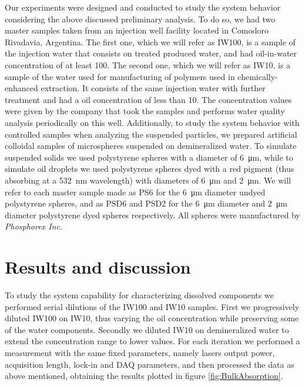 \documentclass[9pt,twocolumn,twoside]{osajnl}
\begin{document}
Our experiments were designed and conducted to study the system behavior considering the above discussed preliminary analysis. To do so, we had two master samples taken from an injection well facility located in Comodoro Rivadavia, Argentina. The first one, which we will refer as IW100, is a sample of the injection water that consists on treated produced water, and had oil-in-water concentration of at least \SI{100}{\ppm}. The second one, which we will refer as IW10, is a sample of the water used for manufacturing of polymers used in chemically-enhanced extraction. It consists of the same injection water with further treatment and had a oil concentration of less than \SI{10}{\ppm}. The concentration values were given by the company that took the samples and performs water quality analysis periodically on this well. Additionally, to study the system behavior with controlled samples when analyzing the suspended particles, we prepared artificial colloidal samples of microspheres suspended on demineralized water. To simulate suspended solids we used polystyrene spheres with a diameter of \SI{6}{\micro\metre}, while to simulate oil droplets we used polystyrene spheres dyed with a red pigment (thus absorbing at a \SI{532}{\nano\metre} wavelength) with diameters of \SI{6}{\micro\metre} and \SI{2}{\micro\metre}. We will refer to each master sample made as PS6 for the \SI{6}{\micro\metre} diameter undyed polystyrene spheres, and as PSD6 and PSD2 for the \SI{6}{\micro\metre} diameter and \SI{2}{\micro\metre} diameter polystyrene dyed spheres respectively. All spheres were manufactured by \emph{Phosphorex Inc.}








\section{Results and discussion}
\label{Results}

To study the system capability for characterizing dissolved components we performed serial dilutions of the IW100 and IW10 samples. First we progressively diluted IW100 on IW10, thus varying the oil concentration while preserving some of the water components. Secondly we diluted IW10 on demineralized water to extend the concentration range to lower values. For each iteration we performed a measurement with the same fixed parameters, namely lasers output power, acquisition length, lock-in and DAQ parameters, and then processed the data as above mentioned, obtaining the results plotted in figure \ref{fig:BulkAbsorption}.
\end{document}
